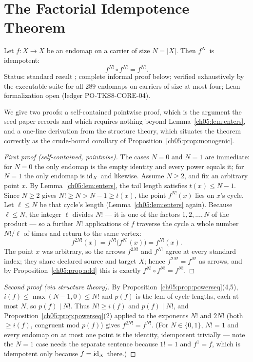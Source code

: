 \section{The Factorial Idempotence Theorem}
\label{ch05:sec:factorial}

\begin{theorem}
\label{ch05:thm:factorial}
Let $f : X \to X$ be an endomap on a carrier of size $N = |X|$. Then
$f^{N!}$ is idempotent:
\[
  f^{N!} \circ f^{N!} = f^{N!}.
\]
\textup{Status: standard result \cite{pin, howie}; complete informal proof
below; verified exhaustively by the executable suite for all $289$ endomaps
on carriers of size at most four; Lean formalization open
(ledger PO-TKS8-CORE-04).}
\end{theorem}

We give two proofs: a self-contained pointwise proof, which is the argument
the seed paper records and which requires nothing beyond
Lemma~\ref{ch05:lem:enters}, and a one-line derivation from the structure
theory, which situates the theorem correctly as the crude-bound corollary
of Proposition~\ref{ch05:prop:monogenic}.

\begin{proof}[First proof (self-contained, pointwise)]
The cases $N = 0$ and $N = 1$ are immediate: for $N = 0$ the only endomap
is the empty identity and every power equals it; for $N = 1$ the only
endomap is $\mathrm{id}_X$ and likewise. Assume $N \ge 2$, and fix an arbitrary
point $x$. By Lemma~\ref{ch05:lem:enters}, the tail length satisfies
$t(x) \le N - 1$. Since $N \ge 2$ gives $N! \ge N > N - 1 \ge t(x)$, the
point $f^{N!}(x)$ lies on $x$'s cycle. Let $\ell \le N$ be that cycle's
length (Lemma~\ref{ch05:lem:enters} again). Because $\ell \le N$, the
integer $\ell$ divides $N!$ --- it is one of the factors $1, 2, \dots, N$
of the product --- so a further $N!$ applications of $f$ traverse the cycle
a whole number $N!/\ell$ of times and return to the same vertex:
\[
  f^{2 N!}(x) = f^{N!}\bigl(f^{N!}(x)\bigr) = f^{N!}(x).
\]
The point $x$ was arbitrary, so the arrows $f^{2N!}$ and $f^{N!}$ agree at
every standard index; they share declared source and target $X$; hence
$f^{2N!} = f^{N!}$ as arrows, and by
Proposition~\ref{ch05:prop:add} this is exactly
$f^{N!} \circ f^{N!} = f^{N!}$.
\end{proof}

\begin{proof}[Second proof (via structure theory)]
By Proposition~\ref{ch05:prop:powerseq}(4,5), $i(f) \le \max(N-1, 0) \le
N!$ and $p(f)$ is the lcm of cycle lengths, each at most $N$, so
$p(f) \mid N!$. Thus $N! \ge i(f)$ and $p(f) \mid N!$, and
Proposition~\ref{ch05:prop:powerseq}(2) applied to the exponents $N!$ and
$2N!$ (both $\ge i(f)$, congruent mod $p(f)$) gives $f^{2N!} = f^{N!}$.
(For $N \in \{0, 1\}$, $N! = 1$ and every endomap on at most one point is
the identity, idempotent trivially --- note the $N=1$ case needs the
separate sentence because $1! = 1$ and $f^{1} = f$, which is idempotent
only because $f = \mathrm{id}_X$ there.)
\end{proof}

